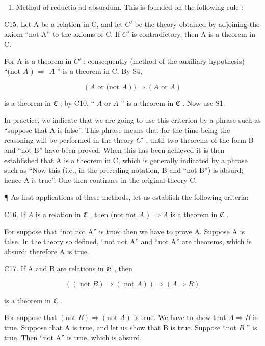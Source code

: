 \begin{enumerate}
\def\labelenumi{\Roman{enumi}.}
\setcounter{enumi}{1}
\tightlist
\item
  Method of reductio ad absurdum. This is founded on the following rule :
\end{enumerate}

C15. Let A be a relation in C, and let \(C'\) be the theory obtained by adjoining the axiom ``not A'' to the axioms of C. If \(C'\) is contradictory, then A is a theorem in C.

For A is a theorem in \(C'\) ; consequently (method of the auxiliary hypothesis) ``(not \(A\) ) \(\Longrightarrow\) \(A\) '' is a theorem in C. By S4,

\[
(A \text {   or   (not   } A)) \Longrightarrow (A \text {   or   } A)
\]

is a theorem in \(\mathfrak{C}\) ; by C10, `` \(A\) or \(A\) '' is a theorem in \(\mathfrak{C}\) . Now use S1.

In practice, we indicate that we are going to use this criterion by a phrase such as ``suppose that A is false''. This phrase means that for the time being the reasoning will be performed in the theory \(C'\) , until two theorems of the form B and ``not B'' have been proved. When this has been achieved it is then established that A is a theorem in C, which is generally indicated by a phrase such as ``Now this (i.e., in the preceding notation, B and ``not B'') is absurd; hence A is true''. One then continues in the original theory C.

¶ As first applications of these methods, let us establish the following criteria:

C16. If \(A\) is a relation in \(\mathfrak{C}\) , then (not not \(A\) ) \(\Longrightarrow A\) is a theorem in \(\mathfrak{C}\) .

For suppose that ``not not A'' is true; then we have to prove A. Suppose A is false. In the theory so defined, ``not not A'' and ``not A'' are theorems, which is absurd; therefore A is true.

C17. If A and B are relations in \(\mathfrak{G}\) , then

\[
((\text { not } B) \Longrightarrow (\text { not } A)) \Longrightarrow (A \Longrightarrow B)
\]

is a theorem in \(\mathfrak{C}\) .

For suppose that \((\text{not } B) \Longrightarrow (\text{not } A)\) is true. We have to show that \(A \Longrightarrow B\) is true. Suppose that A is true, and let us show that B is true. Suppose ``not \(B\) '' is true. Then ``not A'' is true, which is absurd.

